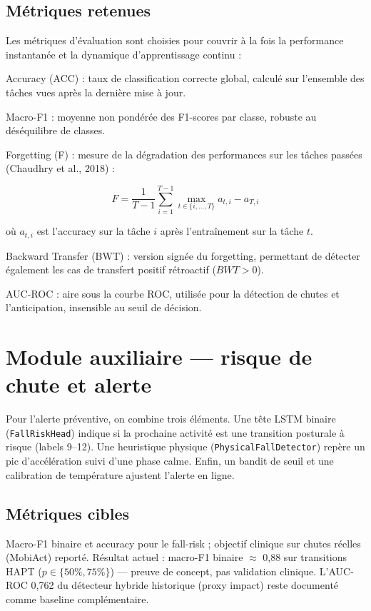 \documentclass[a4paper,12pt]{report}
\begin{document}
\subsection{Métriques retenues}

Les métriques d'évaluation sont choisies pour couvrir à la fois la performance instantanée et la dynamique d'apprentissage continu :

Accuracy (ACC) : taux de classification correcte global, calculé sur l'ensemble des tâches vues après la dernière mise à jour.

Macro-F1 : moyenne non pondérée des F1-scores par classe, robuste au déséquilibre de classes.

Forgetting (F) : mesure de la dégradation des performances sur les tâches passées (Chaudhry et al., 2018) :

$$F = \frac{1}{T-1} \sum_{i=1}^{T-1} \max_{t \in \{i,\ldots,T\}} a_{t,i} - a_{T,i}$$

où $a_{t,i}$ est l'accuracy sur la tâche $i$ après l'entraînement sur la tâche $t$.

Backward Transfer (BWT) : version signée du forgetting, permettant de détecter également les cas de transfert positif rétroactif ($BWT > 0$).

AUC-ROC : aire sous la courbe ROC, utilisée pour la détection de chutes et l'anticipation, insensible au seuil de décision.

\section{Module auxiliaire — risque de chute et alerte}

Pour l'alerte préventive, on combine trois éléments. Une tête LSTM binaire
(\texttt{FallRiskHead}) indique si la prochaine activité est une transition
posturale à risque (labels 9--12). Une heuristique physique
(\texttt{PhysicalFallDetector}) repère un pic d'accélération suivi d'une
phase calme. Enfin, un bandit de seuil et une calibration de température
ajustent l'alerte en ligne.

\subsection{Métriques cibles}

Macro-F1 binaire et accuracy pour le fall-risk ; objectif clinique sur chutes
réelles (MobiAct) reporté. Résultat actuel : macro-F1 binaire $\approx$ 0,88
sur transitions HAPT ($p\in\{50\%,75\%\}$) — preuve de concept, pas validation
clinique. L'AUC-ROC 0,762 du détecteur hybride historique (proxy impact)
reste documenté comme baseline complémentaire.
\end{document}
